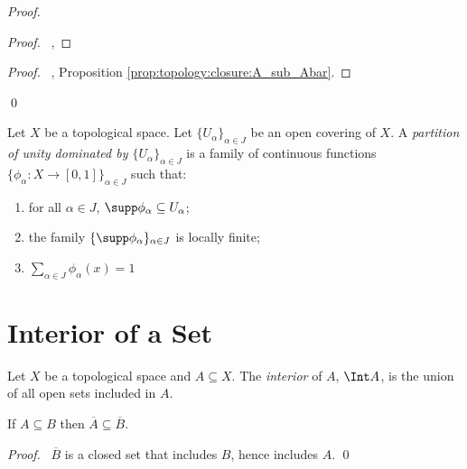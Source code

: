 \begin{proof}
  \pf
  \begin{proof}
    \pf\ , 
  \end{proof}
  \begin{proof}
    \pf\ , Proposition \ref{prop:topology:closure:A_sub_Abar}.
  \end{proof}
  \qed
\end{proof}

\begin{df}
 Let $X$ be a topological space.
Let $\{ U_\alpha \}_{\alpha \in J}$ be an open covering of $X$.
A \emph{partition of unity dominated by $\{ U_\alpha \}_{\alpha \in J}$}
is a family of continuous functions $\{ \phi_\alpha : X \rightarrow [0,1] \}_{\alpha \in J}$ such that:
\begin{enumerate}
\item for all $\alpha \in J$, $\supp \phi_\alpha \subseteq U_\alpha$;
\item the family $\{ \supp \phi_\alpha \}_{\alpha \in J}$ is locally finite;
\item $\sum_{\alpha \in J} \phi_\alpha(x) = 1$
\end{enumerate}
\end{df}

\section{Interior of a Set}

\begin{df}[Interior]
  Let $X$ be a topological space and $A \subseteq X$.
  The \emph{interior} of $A$, $\Int A$, is the union of all open sets
  included
  in $A$.
\end{df}

\begin{lm}
  If $A \subseteq B$ then $\overline{A} \subseteq \overline{B}$.
\end{lm}

\begin{proof}
  \pf\ $\overline{B}$ is a closed set that includes $B$, hence includes $A$.
  \qed
\end{proof}

